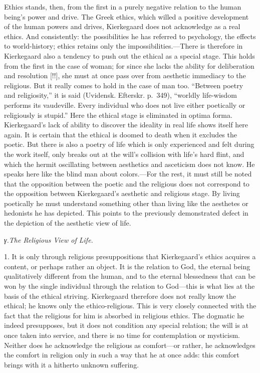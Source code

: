 \documentclass[12pt,a4paper]{book}
\newcommand{\opage}[1]{\marginnote{\footnotesize\textit{[#1]}}}
\begin{document}
Ethics stands, then, from the first in a purely negative relation to the
human being's power and drive. The Greek ethics, which willed a positive
development of the human powers and drives, Kierkegaard does not
acknowledge as a real ethics. And consistently: the possibilities he has
referred to psychology, the effects to world-history; ethics retains only
the impossibilities.---There is therefore in Kierkegaard also a tendency to
push out the ethical as a special stage. This holds from the first in the
case of woman; for since she lacks the ability for deliberation and
resolution [!!], she must at once pass over from aesthetic immediacy to the
religious. But it really comes to hold in the case of man too. ``Between
poetry and religiosity,'' it is said (Uvidensk. Efterskr. p.~349),
``worldly life-wisdom performs its vaudeville. Every individual who does
not live either poetically or religiously is stupid.'' Here the ethical
\opage{109}stage is eliminated in optima forma. Kierkegaard's lack of
ability to discover the ideality in real life shows itself here again. It
is certain that the ethical is doomed to death when it excludes the
poetic. But there is also a poetry of life which is only experienced and
felt during the work itself, only breaks out at the will's collision with
life's hard flint, and which the hermit oscillating between aesthetics and
asceticism does not know. He speaks here like the blind man about
colors.---For the rest, it must still be noted that the opposition between
the poetic and the religious does not correspond to the opposition between
Kierkegaard's aesthetic and religious stage. By living poetically he must
understand something other than living like the aesthetes or hedonists he
has depicted. This points to the previously demonstrated defect in the
depiction of the aesthetic view of life.

\begin{center}\textit{γ.\enspace The Religious View of Life.}\end{center}

1. It is only through religious presuppositions that Kierkegaard's ethics
acquires a content, or perhaps rather an object. It is the relation to
God, the eternal being qualitatively different from the human, and to the
eternal blessedness that can be won by the single individual through the
relation to God---this is what lies at the basis of the ethical striving.
Kierkegaard therefore does not really know the ethical; he knows only the
ethico-religious. This is very closely connected with the fact that the
religious for him is absorbed in religious ethics. The dogmatic he indeed
presupposes, but it does not condition any special relation; the will is
at once taken into service, and there is no time for contemplation or
mysticism. Neither does he acknowledge the religious as comfort---or
rather, he acknowledges the comfort in religion only in such a way that he
at once adds: this comfort brings with it a hitherto unknown suffering.
\end{document}
